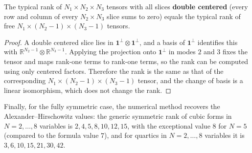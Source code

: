   \begin{lemma}
    The typical rank of $N_1 \times N_2 \times N_3$ tensors with all slices \textbf{double centered} (every row and column of every $N_2 \times N_3$ slice sums to zero) equals the typical rank of free $N_1 \times (N_2 - 1) \times (N_3 - 1)$ tensors.
  \end{lemma}
  \begin{proof}
    A double centered slice lies in $\mathbf{1}^\perp \otimes \mathbf{1}^\perp$, and a basis of $\mathbf{1}^\perp$ identifies this with $\mathbb{R}^{N_2 - 1} \otimes \mathbb{R}^{N_3 - 1}$. Applying the projection onto $\mathbf{1}^\perp$ in modes $2$ and $3$ fixes the tensor and maps rank-one terms to rank-one terms, so the rank can be computed using only centered factors. Therefore the rank is the same as that of the corresponding $N_1 \times (N_2 - 1) \times (N_3 - 1)$ tensor, and the change of basis is a linear isomorphism, which does not change the rank.
  \end{proof}

  Finally, for the fully symmetric case, the numerical method recovers the Alexander--Hirschowitz values: the generic symmetric rank of cubic forms in $N = 2, \ldots, 8$ variables is $2, 4, 5, 8, 10, 12, 15$, with the exceptional value $8$ for $N = 5$ (compared to the formula value $7$), and for quartics in $N = 2, \ldots, 8$ variables it is $3, 6, 10, 15, 21, 30, 42$.
